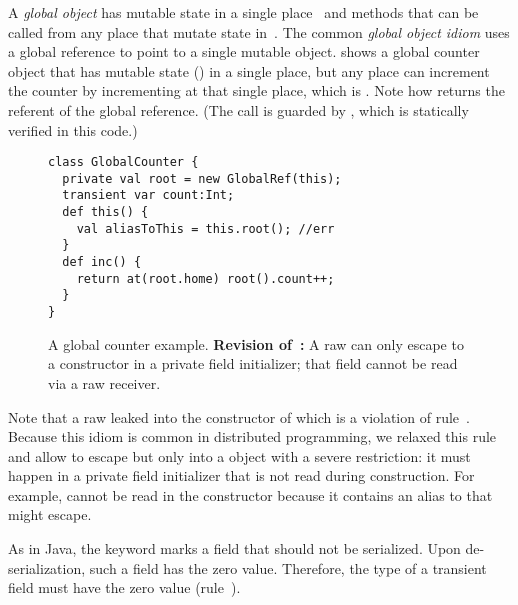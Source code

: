 A \emph{global object} has mutable state in a single place~
    and methods that can be called from any place that mutate state in~.
The common \emph{global object idiom}
    uses a global reference
    to point to a single mutable object.
 shows a global counter object
    that has mutable state () in a single place,
    but any place can increment the counter by incrementing  at that single place,
    which is .
Note how  returns the referent of the global reference.
(The call  is guarded by , which is statically verified in this code.)



\begin{figure}
\begin{lstlisting}
class GlobalCounter {
  private val root = new GlobalRef(this);
  transient var count:Int;
  def this() {
    val aliasToThis = this.root(); //err
  }
  def inc() {
    return at(root.home) root().count++;
  }
}
\end{lstlisting}
\caption{A global counter example.
    \textbf{Revision of~:}
        A raw \this can only escape to a  constructor in a private field initializer;
            that field cannot be read via a raw \this receiver.
    }
\label{Figure:GlobalRef}
\end{figure}

Note that a raw \this leaked into the constructor of 
    which is a violation of rule~.
Because this idiom is common in distributed programming,
    we relaxed this rule and allow \this to escape but only into a  object
    with a severe restriction:
    it must happen in a private field initializer that is not read during construction.
For example,  cannot be read in the constructor
    because it contains an alias to  that might escape.

As in Java, the  keyword marks a field that should not be serialized.
Upon de-serialization, such a field has the zero value.
Therefore, the type of a transient field must have the zero value (rule~).

